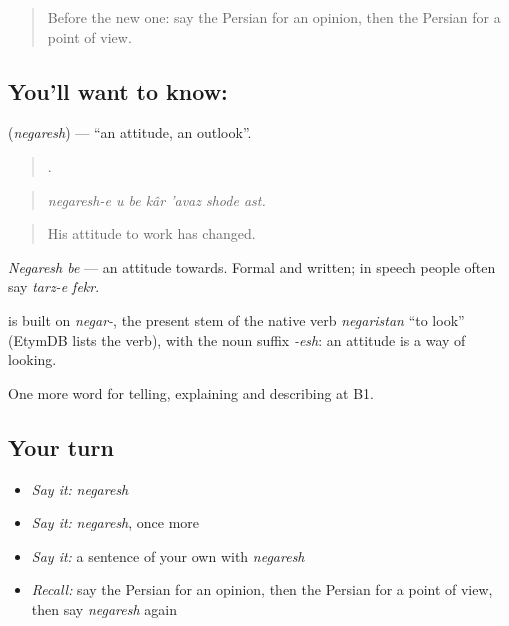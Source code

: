 \label{lesson:FA-C360-negaresh}



\begin{quote}
Before the new one: say the Persian for an opinion, then the Persian for a point of view.
\end{quote}

\subsection*{You'll want to know: }
\textbf{} (\emph{negaresh}) — \textquotedblleft{}an attitude, an outlook\textquotedblright{}.

\begin{quote}
      .
\end{quote}

\begin{quote}
\emph{negaresh-e u be kâr 'avaz shode ast.}
\end{quote}

\begin{quote}
His attitude to work has changed.
\end{quote}

\emph{Negaresh be} — an attitude towards. Formal and written; in speech people often say \emph{tarz-e fekr}.

\begin{cousinweb}
\textbf{} is built on \emph{negar-}, the present stem of the native verb \emph{negaristan} \textquotedblleft{}to look\textquotedblright{} (EtymDB lists the verb), with the noun suffix \emph{-esh}: an attitude is a way of looking.
\end{cousinweb}

\begin{grammarlens}[title={What you've built}]
One more word for telling, explaining and describing at B1.
\end{grammarlens}

\subsection*{Your turn}
\begin{itemize}
\raggedright
  \item \emph{Say it:} \emph{negaresh}
  \item \emph{Say it:} \emph{negaresh}, once more
  \item \emph{Say it:} a sentence of your own with \emph{negaresh}
  \item \emph{Recall:} say the Persian for an opinion, then the Persian for a point of view, then say \emph{negaresh} again
\end{itemize}


